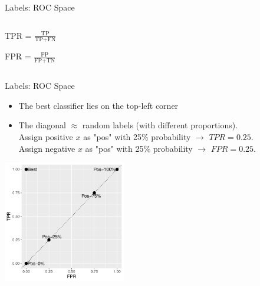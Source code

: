 \documentclass[11pt,compress,t,notes=noshow, xcolor=table]{beamer}
\newenvironment{knitrout}{}{} %
\begin{document}
\begin{vbframe}{Labels: ROC Space}
\begin{columns}
\begin{column}{0.5\textwidth}
\begin{center}
\lz\lz

TPR = $\frac{\text{TP}}{\text{TP} + \text{FN}}$

\lz

FPR = $\frac{\text{FP}}{\text{FP} + \text{TN}}$
\end{center}


\end{column}
\end{columns}

\end{vbframe}


\begin{vbframe}{Labels: ROC Space}
  \begin{itemize}
  \item The best classifier lies on the top-left corner
  \item The diagonal $\approx$ random labels (with different proportions).\\
  Assign positive $x$ as "pos" with 25\% probability $\rightarrow$ $TPR = 0.25$.\\
  Assign negative $x$ as "pos" with 25\% probability $\rightarrow$ $FPR = 0.25$.
\end{itemize}

\lz
\begin{knitrout}\scriptsize
{}\color{fgcolor}

{\centering \includegraphics[width=0.4\textwidth]{figure/eval_mclass_roc_sp_2}

}



\end{knitrout}
\end{vbframe}
\end{document}
